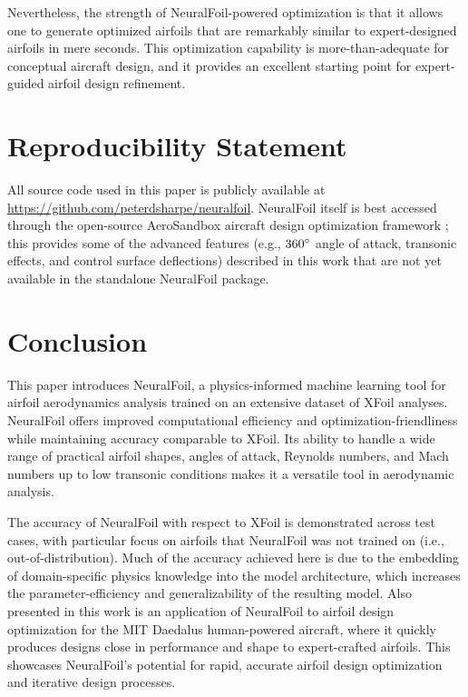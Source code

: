 \documentclass[conf]{new-aiaa}
\begin{document}
    Nevertheless, the strength of NeuralFoil-powered optimization is that it allows one to generate optimized airfoils that are remarkably similar to expert-designed airfoils in mere seconds. This optimization capability is more-than-adequate for conceptual aircraft design, and it provides an excellent starting point for expert-guided airfoil design refinement.


    \section{Reproducibility Statement}

    All source code used in this paper is publicly available at \url{https://github.com/peterdsharpe/neuralfoil}. NeuralFoil itself is best accessed through the open-source AeroSandbox aircraft design optimization framework \cite{sharpe_aerosandbox_2021}; this provides some of the advanced features (e.g., $360\degree$ angle of attack, transonic effects, and control surface deflections) described in this work that are not yet available in the standalone NeuralFoil package.


    \section{Conclusion}
    \label{sec:conclusion}

    This paper introduces NeuralFoil, a physics-informed machine learning tool for airfoil aerodynamics analysis trained on an extensive dataset of XFoil analyses. NeuralFoil offers improved computational efficiency and optimization-friendliness while maintaining accuracy comparable to XFoil. Its ability to handle a wide range of practical airfoil shapes, angles of attack, Reynolds numbers, and Mach numbers up to low transonic conditions makes it a versatile tool in aerodynamic analysis.

    The accuracy of NeuralFoil with respect to XFoil is demonstrated across test cases, with particular focus on airfoils that NeuralFoil was not trained on (i.e., out-of-distribution). Much of the accuracy achieved here is due to the embedding of domain-specific physics knowledge into the model architecture, which increases the parameter-efficiency and generalizability of the resulting model. Also presented in this work is an application of NeuralFoil to airfoil design optimization for the MIT Daedalus human-powered aircraft, where it quickly produces designs close in performance and shape to expert-crafted airfoils. This showcases NeuralFoil's potential for rapid, accurate airfoil design optimization and iterative design processes.
\end{document}
